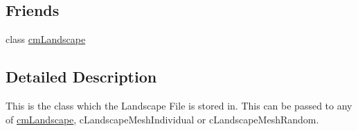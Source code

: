 \subsection*{Friends}
\begin{DoxyCompactItemize}
\item 
\hypertarget{classc_landscape_mesh_file_a642b5e78056302f99f656983a53beb6d}{
class \hyperlink{classc_landscape_mesh_file_a642b5e78056302f99f656983a53beb6d}{cmLandscape}}
\label{classc_landscape_mesh_file_a642b5e78056302f99f656983a53beb6d}

\end{DoxyCompactItemize}


\subsection{Detailed Description}
This is the class which the Landscape File is stored in. This can be passed to any of \hyperlink{classcm_landscape}{cmLandscape}, cLandscapeMeshIndividual or cLandscapeMeshRandom. 